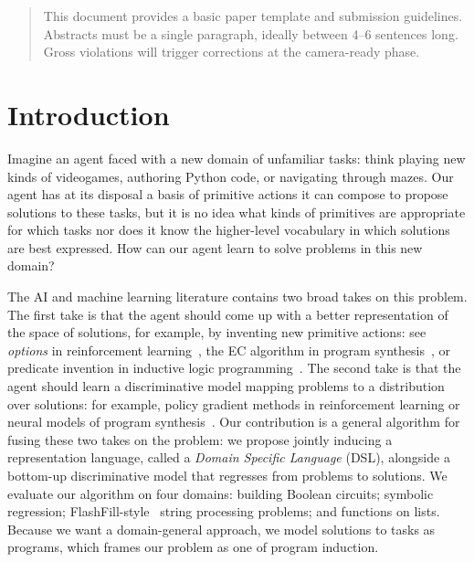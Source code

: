 \documentclass{article}
\begin{document}
\printAffiliationsAndNotice{\icmlEqualContribution} %

\begin{abstract}
This document provides a basic paper template and submission guidelines.
Abstracts must be a single paragraph, ideally between 4--6 sentences long.
Gross violations will trigger corrections at the camera-ready phase.
\end{abstract}

\section{Introduction}

Imagine an agent faced with a new domain of unfamiliar tasks: think
playing new kinds of videogames, authoring Python code, or navigating
through mazes.  Our agent has at its disposal a basis of primitive
actions it can compose to propose solutions to these tasks, but it is
no idea what kinds of primitives are appropriate for which tasks
nor does it know the higher-level vocabulary in which solutions are
best expressed.  How can our agent learn to solve problems in this new
domain?


The AI and machine learning literature contains two broad takes on this problem.
The first take is that the agent should come up with a better representation of the space of solutions,
for example, by inventing new primitive actions: see \emph{options} in reinforcement learning~\cite{stolle2002learning}, the EC algorithm in program synthesis~\cite{Dechter:2013:BLV:2540128.2540316}, or predicate invention in inductive logic programming~\cite{muggleton2015meta}.
The second take is that the agent should learn a discriminative model mapping problems to a distribution over solutions: for example, policy gradient methods in reinforcement learning or neural models of program synthesis~\cite{devlin2017robustfill,balog2016deepcoder}.
Our contribution is a general algorithm for fusing these two takes on the problem:
we propose jointly inducing a representation language, called a \emph{Domain Specific Language} (DSL),
alongside a bottom-up discriminative model that regresses from problems to solutions.
We evaluate our algorithm on four domains:
building Boolean circuits; symbolic regression; FlashFill-style~\cite{gulwani2011automating} string processing problems; and functions on lists.
Because we want a domain-general
approach,
we model solutions to tasks as
programs,
which frames our problem as one of program induction.
\end{document}
